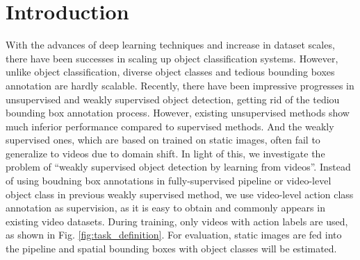 \section{Introduction}
\label{sec:intro}

With the advances of deep learning techniques and increase in dataset scales, there have been successes in scaling up object classification systems. However, unlike object classification, diverse object classes and tedious bounding boxes annotation are hardly scalable. Recently, there have been impressive progresses in unsupervised and weakly supervised object detection, getting rid of the tediou bounding box annotation process. However, existing unsupervised methods show much inferior performance compared to supervised methods. And the weakly supervised ones, which are based on trained on static images, often fail to generalize to videos due to domain shift. In light of this, we investigate the problem of ``weakly supervised object detection by learning from videos''. Instead of using boudning box annotations in fully-supervised pipeline or video-level object class in previous weakly supervised method, we use video-level action class annotation as supervision, as it is easy to obtain and commonly appears in existing video datasets. During training, only videos with action labels are used, as shown in Fig. \ref{fig:task_definition}. For evaluation, static images are fed into the pipeline and spatial bounding boxes with object classes will be estimated.


